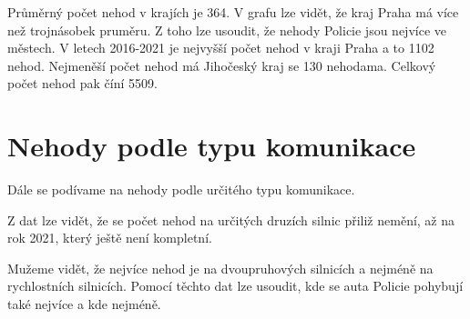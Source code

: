 \documentclass[11pt, a4paper]{article}
\begin{document}
Průměrný počet nehod v krajích je 364. V grafu lze vidět, že kraj Praha má více než trojnásobek pruměru. Z toho lze usoudit, že nehody Policie jsou nejvíce ve městech. V letech 2016-2021 je nejvyšší počet nehod v kraji Praha a to 1102 nehod. Nejmeněší počet nehod má Jihočeský kraj se 130 nehodama. Celkový počet nehod pak číní 5509.

\section{Nehody podle typu komunikace}
Dále se podívame na nehody podle určitého typu komunikace.

\def\arraystretch{1.5}
\begin{table}[ht]
\caption{Počet nehod policie ČR v jednotlivých letech na ruzných komunikacích}
\label{fig:table}
\end{table}

Z dat lze vidět, že se počet nehod na určitých druzích silnic přiliž nemění, až na rok 2021, který ještě není kompletní. 

Mužeme vidět, že nejvíce nehod je na dvoupruhových silnicích a nejméně na rychlostních silnicích. Pomocí těchto dat lze usoudit, kde se auta Policie pohybují také nejvíce a kde nejméně. 
\end{document}
